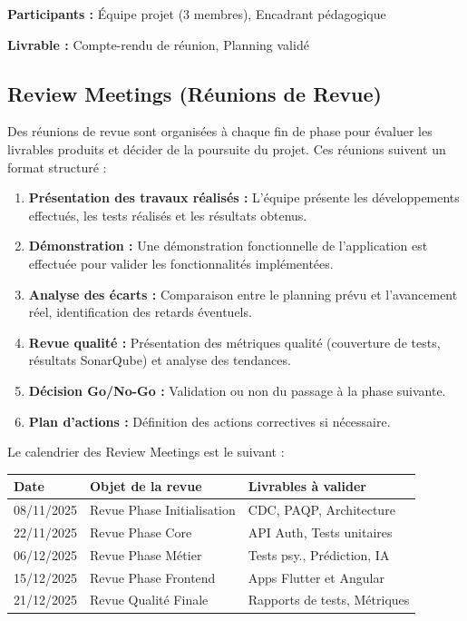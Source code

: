 \documentclass[12pt,a4paper]{report}
\begin{document}
\textbf{Participants :} Équipe projet (3 membres), Encadrant pédagogique

\textbf{Livrable :} Compte-rendu de réunion, Planning validé

\subsection{Review Meetings (Réunions de Revue)}

Des réunions de revue sont organisées à chaque fin de phase pour évaluer les livrables produits et décider de la poursuite du projet. Ces réunions suivent un format structuré :

\begin{enumerate}
    \item \textbf{Présentation des travaux réalisés :} L'équipe présente les développements effectués, les tests réalisés et les résultats obtenus.
    
    \item \textbf{Démonstration :} Une démonstration fonctionnelle de l'application est effectuée pour valider les fonctionnalités implémentées.
    
    \item \textbf{Analyse des écarts :} Comparaison entre le planning prévu et l'avancement réel, identification des retards éventuels.
    
    \item \textbf{Revue qualité :} Présentation des métriques qualité (couverture de tests, résultats SonarQube) et analyse des tendances.
    
    \item \textbf{Décision Go/No-Go :} Validation ou non du passage à la phase suivante.
    
    \item \textbf{Plan d'actions :} Définition des actions correctives si nécessaire.
\end{enumerate}

Le calendrier des Review Meetings est le suivant :

\begin{center}
\begin{tabular}{|l|l|l|}
    \hline
    \textbf{Date} & \textbf{Objet de la revue} & \textbf{Livrables à valider} \\
    \hline
    08/11/2025 & Revue Phase Initialisation & CDC, PAQP, Architecture \\
    \hline
    22/11/2025 & Revue Phase Core & API Auth, Tests unitaires \\
    \hline
    06/12/2025 & Revue Phase Métier & Tests psy., Prédiction, IA \\
    \hline
    15/12/2025 & Revue Phase Frontend & Apps Flutter et Angular \\
    \hline
    21/12/2025 & Revue Qualité Finale & Rapports de tests, Métriques \\
    \hline
\end{tabular}
\end{center}
\end{document}
